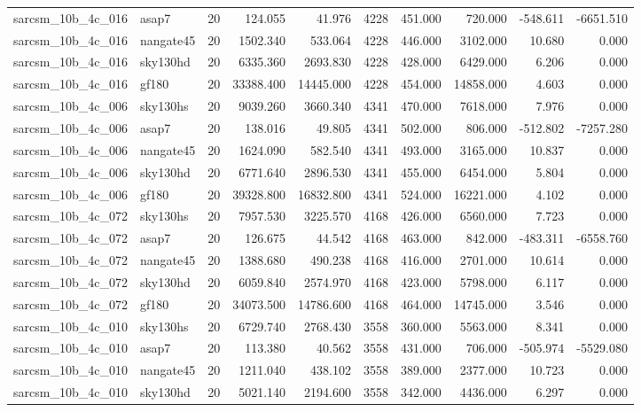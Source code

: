 \begin{longtable}{llrrrrrrrr}
sarcsm\_10b\_4c\_016 & asap7 & 20 & 124.055 & 41.976 & 4228 & 451.000 & 720.000 & -548.611 & -6651.510 \\
sarcsm\_10b\_4c\_016 & nangate45 & 20 & 1502.340 & 533.064 & 4228 & 446.000 & 3102.000 & 10.680 & 0.000 \\
sarcsm\_10b\_4c\_016 & sky130hd & 20 & 6335.360 & 2693.830 & 4228 & 428.000 & 6429.000 & 6.206 & 0.000 \\
sarcsm\_10b\_4c\_016 & gf180 & 20 & 33388.400 & 14445.000 & 4228 & 454.000 & 14858.000 & 4.603 & 0.000 \\
sarcsm\_10b\_4c\_006 & sky130hs & 20 & 9039.260 & 3660.340 & 4341 & 470.000 & 7618.000 & 7.976 & 0.000 \\
sarcsm\_10b\_4c\_006 & asap7 & 20 & 138.016 & 49.805 & 4341 & 502.000 & 806.000 & -512.802 & -7257.280 \\
sarcsm\_10b\_4c\_006 & nangate45 & 20 & 1624.090 & 582.540 & 4341 & 493.000 & 3165.000 & 10.837 & 0.000 \\
sarcsm\_10b\_4c\_006 & sky130hd & 20 & 6771.640 & 2896.530 & 4341 & 455.000 & 6454.000 & 5.804 & 0.000 \\
sarcsm\_10b\_4c\_006 & gf180 & 20 & 39328.800 & 16832.800 & 4341 & 524.000 & 16221.000 & 4.102 & 0.000 \\
sarcsm\_10b\_4c\_072 & sky130hs & 20 & 7957.530 & 3225.570 & 4168 & 426.000 & 6560.000 & 7.723 & 0.000 \\
sarcsm\_10b\_4c\_072 & asap7 & 20 & 126.675 & 44.542 & 4168 & 463.000 & 842.000 & -483.311 & -6558.760 \\
sarcsm\_10b\_4c\_072 & nangate45 & 20 & 1388.680 & 490.238 & 4168 & 416.000 & 2701.000 & 10.614 & 0.000 \\
sarcsm\_10b\_4c\_072 & sky130hd & 20 & 6059.840 & 2574.970 & 4168 & 423.000 & 5798.000 & 6.117 & 0.000 \\
sarcsm\_10b\_4c\_072 & gf180 & 20 & 34073.500 & 14786.600 & 4168 & 464.000 & 14745.000 & 3.546 & 0.000 \\
sarcsm\_10b\_4c\_010 & sky130hs & 20 & 6729.740 & 2768.430 & 3558 & 360.000 & 5563.000 & 8.341 & 0.000 \\
sarcsm\_10b\_4c\_010 & asap7 & 20 & 113.380 & 40.562 & 3558 & 431.000 & 706.000 & -505.974 & -5529.080 \\
sarcsm\_10b\_4c\_010 & nangate45 & 20 & 1211.040 & 438.102 & 3558 & 389.000 & 2377.000 & 10.723 & 0.000 \\
sarcsm\_10b\_4c\_010 & sky130hd & 20 & 5021.140 & 2194.600 & 3558 & 342.000 & 4436.000 & 6.297 & 0.000 \\

\end{longtable}
